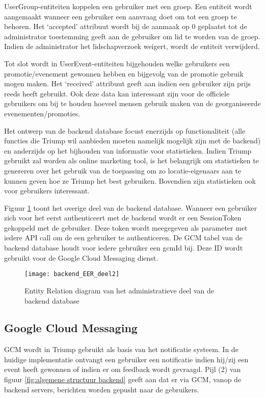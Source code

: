 UserGroup-entiteiten koppelen een gebruiker met een groep. Een entiteit wordt aangemaakt wanneer een gebruiker een aanvraag doet om tot een groep te behoren. Het `accepted' attribuut wordt bij de aanmaak op 0 geplaatst tot de administrator toestemming geeft aan de gebruiker om lid te worden van de groep. Indien de administrator het lidschapverzoek weigert, wordt de entiteit verwijderd.

Tot slot wordt in UserEvent-entiteiten bijgehouden welke gebruikers een promotie/evenement gewonnen hebben en bijgevolg van de promotie gebruik mogen maken. Het `received' attribuut geeft aan indien een gebruiker zijn prijs reeds heeft gebruikt. Ook deze data kan interessant zijn voor de officïele gebruikers om bij te houden hoeveel mensen gebruik maken van de georganiseerde evenementen/promoties.

Het ontwerp van de backend database focust enerzijds op functionaliteit (alle functies die Triump wil aanbieden moeten namelijk mogelijk zijn met de backend) en anderzijds op het bijhouden van informatie voor statistieken. Indien Triump gebruikt zal worden als online marketing tool, is het belangrijk om statistieken te genereren over het gebruik van de toepassing om zo locatie-eigenaars aan te kunnen geven hoe ze Triump het best gebruiken. Bovendien zijn statistieken ook voor gebruikers interessant.

Figuur \ref{fig:Backend ER 2} toont het overige deel van de backend database. Wanneer een gebruiker zich voor het eerst authenticeert met de backend wordt er een SessionToken gekoppeld met de gebruiker. Deze token wordt meegegeven als parameter met iedere API call om de een gebruiker te authenticeren. De GCM tabel van de backend database houdt voor iedere gebruiker een gcmId bij. Deze ID wordt gebruikt voor de Google Cloud Messaging dienst.

\begin{figure}[H]
	\centering
	\texttt{[image: backend\_EER\_deel2]}
	\caption{Entity Relation diagram van het administratieve deel van de backend database}
	\label{fig:Backend ER 2}
\end{figure}
\subsection{Google Cloud Messaging}
GCM wordt in Triump gebruikt als basis van het notificatie systeem. In de huidige implementatie ontvangt een gebruiker een notificatie indien hij/zij een event heeft gewonnen of indien er om feedback wordt gevraagd. 
Pijl (2) van figuur \ref{fig:algemene structuur backend} geeft aan dat er via GCM, vanop de backend servers, berichten worden gepusht naar de gebruikers.

